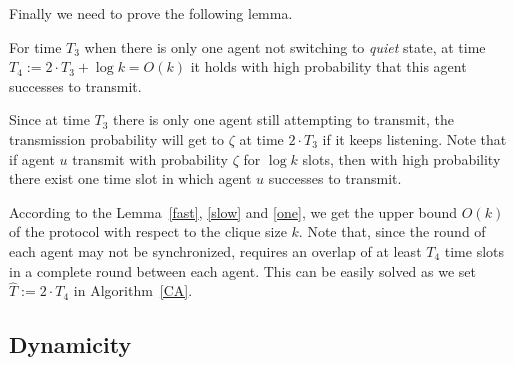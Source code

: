 Finally we need to prove the following lemma.
\begin{lemma}
    \label{one}
    For time $T_3$ when there is only one agent not switching to \emph{quiet} state,
    at time $T_4 := 2 \cdot T_3 + \log k = O(k)$ it holds with high 
    probability that this agent successes to transmit.
\end{lemma}
\begin{IEEEproof}
    Since at time $T_3$ there is only one agent still attempting to transmit,
    the transmission probability will get to $\zeta$ at time $2\cdot T_3$ if it keeps
    listening. Note that if agent $u$ transmit with probability $\zeta$ for $\log k$ slots,
    then with high probability there exist one time slot in which agent $u$ successes to transmit.
\end{IEEEproof}

According to the Lemma~\ref{fast}, \ref{slow} and \ref{one},
we get the upper bound $O(k)$ of the {\pName} protocol with respect to
the clique size $k$. Note that, since the round of each agent may not be 
synchronized, {\pName} requires an overlap of at least $T_4$ time 
slots in a complete round between each agent.
This can be easily solved as we set $\hat{T} := 2\cdot T_4$ in Algorithm~\ref{CA}. 

\subsection{Dynamicity}
\label{dynamic}